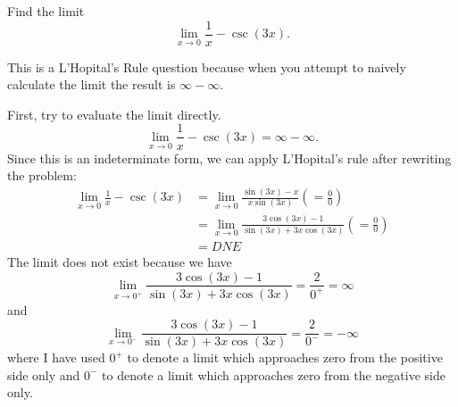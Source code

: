 \documentclass{ximera}
\author{Emma Smith Zbarsky}
\begin{document}
\begin{exercise}

Find the limit \[\lim_{x \to 0} \frac{1}{x}- \csc(3x).\]


\begin{hint}
This is a L'Hopital's Rule question because when you attempt to naively
calculate the limit the result is $\infty-\infty$.
\end{hint}


\begin{hint}
First, try to evaluate the limit directly.
\[\lim_{x\to 0} \frac{1}{x} - \csc(3x) = \infty-\infty.\] Since this is
an indeterminate form, we can apply L'Hopital's rule after rewriting the
problem: \begin{align*}
\lim_{x\to 0} \frac{1}{x}-\csc(3x) &= \lim_{x\to 0} \frac{\sin(3x)-x}{x\sin(3x)} \left( = \frac{0}{0}\right)\\
&=  \lim_{x\to 0} \frac{3\cos(3x)-1}{\sin(3x)+3x\cos(3x)} \left( =\frac{0}{0}\right) \\
&= DNE
\end{align*} The limit does not exist because we have
\[\lim_{x\to 0^+} \frac{3\cos(3x)-1}{\sin(3x)+3x\cos(3x)} = \frac{2}{0^+} = \infty\]
and
\[\lim_{x\to 0^-} \frac{3\cos(3x)-1}{\sin(3x)+3x\cos(3x)} = \frac{2}{0^-} = -\infty\]
where I have used $0^+$ to denote a limit which approaches zero from the
positive side only and $0^-$ to denote a limit which approaches zero
from the negative side only.
\end{hint}


\begin{multipleChoice}
\choice{$-\infty$}
\choice{$\infty$}
\end{multipleChoice}

\end{exercise}
\end{document}
